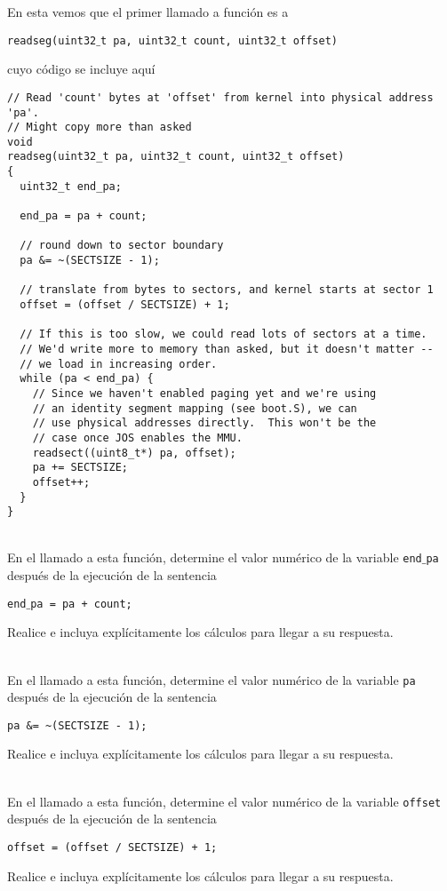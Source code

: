 \documentclass{article}
\begin{document}
En esta vemos que el primer llamado a funci\'on es a 
\begin{center}
{\tt readseg(uint32$\_$t pa, uint32$\_$t count, uint32$\_$t offset)}
\end{center}
cuyo c\'odigo se incluye aqu\'i
\begin{verbatim}
// Read 'count' bytes at 'offset' from kernel into physical address 'pa'.
// Might copy more than asked
void
readseg(uint32_t pa, uint32_t count, uint32_t offset)
{
  uint32_t end_pa;

  end_pa = pa + count;

  // round down to sector boundary
  pa &= ~(SECTSIZE - 1);

  // translate from bytes to sectors, and kernel starts at sector 1
  offset = (offset / SECTSIZE) + 1;

  // If this is too slow, we could read lots of sectors at a time.
  // We'd write more to memory than asked, but it doesn't matter --
  // we load in increasing order.
  while (pa < end_pa) {
    // Since we haven't enabled paging yet and we're using
    // an identity segment mapping (see boot.S), we can
    // use physical addresses directly.  This won't be the
    // case once JOS enables the MMU.
    readsect((uint8_t*) pa, offset);
    pa += SECTSIZE;
    offset++;
  }
}
\end{verbatim}
\\
En el llamado a esta funci\'on, determine el valor num\'erico de la variable 
{\tt end$\_$pa} despu\'es de la ejecuci\'on de la sentencia 
\begin{center}
{\tt end$\_$pa = pa + count;}
\end{center}
Realice e incluya expl\'icitamente los c\'alculos para llegar a su respuesta.

\\
En el llamado a esta funci\'on, determine el valor num\'erico de la variable 
{\tt pa} despu\'es de la ejecuci\'on de la sentencia
\begin{center}
\begin{verbatim}
pa &= ~(SECTSIZE - 1);
\end{verbatim}
\end{center}
Realice e incluya expl\'icitamente los c\'alculos para llegar a su respuesta.

\\
En el llamado a esta funci\'on, determine el valor num\'erico de la variable 
{\tt offset} despu\'es de la ejecuci\'on de la sentencia
\begin{center}
{\tt offset = (offset / SECTSIZE) + 1;}
\end{center}
Realice e incluya expl\'icitamente los c\'alculos para llegar a su respuesta.
\end{document}

